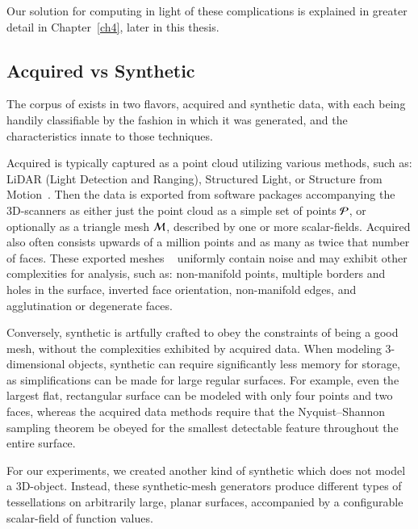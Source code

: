 Our solution for computing  in light of these complications is explained in greater detail in Chapter~\ref{ch4}, later in this thesis.

%
%
%
\subsection{Acquired vs Synthetic \tdd{}}
\label{ch2s3ssAVS3}
The corpus of \tdd{} exists in two flavors, acquired and synthetic data, with each being handily classifiable by the fashion in which it was generated, and the characteristics innate to those techniques.

Acquired \tdd{} is typically captured as a point cloud utilizing various methods, such as: LiDAR (Light Detection and Ranging), Structured Light, or Structure from Motion~\cite[p.~19]{Mara12}. Then the data is exported from software packages accompanying the 3D-scanners as either just the point cloud as a simple set of points $\mathcal{P}$, or optionally as a triangle mesh $\mathcal{M}$, described by one or more scalar-fields. Acquired \tdd{} also often consists upwards of a million points and as many as twice that number of faces. These exported meshes ~\cite[p.~25]{Mara12} uniformly contain noise and may exhibit other complexities for analysis, such as: non-manifold points, multiple borders and holes in the surface, inverted face orientation, non-manifold edges, and agglutination or degenerate faces. ~\cite[p.~28-32]{Mara12}

Conversely, synthetic \tdd{} is artfully crafted to obey the constraints of being a good mesh, without the complexities exhibited by acquired data. When modeling 3-dimensional objects, synthetic \tdd{} can require significantly less memory for storage, as simplifications can be made for large regular surfaces. For example, even the largest flat, rectangular surface can be modeled with only four points and two faces, whereas the acquired data methods require that the Nyquist–Shannon sampling theorem be obeyed for the smallest detectable feature throughout the entire surface.~\cite[p.~19]{Mara12}~\cite[p.~3]{Mara17}

For our experiments, we created another kind of synthetic \tdd{} which does not model a 3D-object. Instead, these synthetic-mesh generators produce different types of tessellations on arbitrarily large, planar surfaces, accompanied by a configurable scalar-field of function values.


